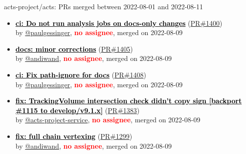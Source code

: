 \begin{frame}[allowframebreaks]{ acts-project/acts: PRs merged 
between 2022-08-01 and 2022-08-11
}
\begin{itemize}
    \item\prmerged
    \hspace*{0.1em}
    \textbf{\href{https://github.com/acts-project/acts/pull/1400}{\textcolor{black}{ci: Do not run analysis jobs on docs-only changes}}}
    (\href{https://github.com/acts-project/acts/pull/1400}{PR\#1400}) \\
    by \href{https://github.com/paulgessinger}{@paulgessinger}, {}\textbf{\textcolor{Red}{no assignee}}, merged on 2022-08-09

    \item\prmerged
    \hspace*{0.1em}
    \textbf{\href{https://github.com/acts-project/acts/pull/1405}{\textcolor{black}{docs: minor corrections}}}
    (\href{https://github.com/acts-project/acts/pull/1405}{PR\#1405}) \\
    by \href{https://github.com/andiwand}{@andiwand}, {}\textbf{\textcolor{Red}{no assignee}}, merged on 2022-08-09

    \item\prmerged
    \hspace*{0.1em}
    \textbf{\href{https://github.com/acts-project/acts/pull/1408}{\textcolor{black}{ci: Fix path-ignore for docs}}}
    (\href{https://github.com/acts-project/acts/pull/1408}{PR\#1408}) \\
    by \href{https://github.com/paulgessinger}{@paulgessinger}, {}\textbf{\textcolor{Red}{no assignee}}, merged on 2022-08-09

    \item\prmerged
    \hspace*{0.1em}
    \textbf{\href{https://github.com/acts-project/acts/pull/1383}{\textcolor{black}{fix: TrackingVolume intersection check didn't copy sign [backport \#1115 to develop/v9.1.x]}}}
    (\href{https://github.com/acts-project/acts/pull/1383}{PR\#1383}) \\
    by \href{https://github.com/acts-project-service}{@acts-project-service}, {}\textbf{\textcolor{Red}{no assignee}}, merged on 2022-08-09

    \item\prmerged
    \hspace*{0.1em}
    \textbf{\href{https://github.com/acts-project/acts/pull/1299}{\textcolor{black}{fix: full chain vertexing}}}
    (\href{https://github.com/acts-project/acts/pull/1299}{PR\#1299}) \\
    by \href{https://github.com/andiwand}{@andiwand}, {}\textbf{\textcolor{Red}{no assignee}}, merged on 2022-08-09


\end{itemize}
\end{frame}
